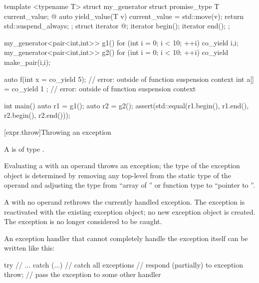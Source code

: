 \begin{example}
\begin{codeblock}
template <typename T>
struct my_generator {
  struct promise_type {
    T current_value;
    @\commentellip@
    auto yield_value(T v) {
      current_value = std::move(v);
      return std::suspend_always{};
    }
  };
  struct iterator { @\commentellip@ };
  iterator begin();
  iterator end();
};

my_generator<pair<int,int>> g1() {
  for (int i = 0; i < 10; ++i) co_yield {i,i};
}
my_generator<pair<int,int>> g2() {
  for (int i = 0; i < 10; ++i) co_yield make_pair(i,i);
}

auto f(int x = co_yield 5);     // error:  outside of function suspension context
int a[] = { co_yield 1 };       // error:  outside of function suspension context

int main() {
  auto r1 = g1();
  auto r2 = g2();
  assert(std::equal(r1.begin(), r1.end(), r2.begin(), r2.end()));
}
\end{codeblock}
\end{example}

[expr.throw]{Throwing an exception}%
%
%
%
%
\begin{bnf}
\br
      
\end{bnf}

\pnum
A  is of type .

\pnum
Evaluating a  with an operand throws an
exception; the type of the exception object is determined by removing
any top-level  from the static type of the
operand and adjusting the type
from ``array of '' or function type 
to ``pointer to ''.

\pnum
{}%
A
with no operand rethrows the currently handled exception.
The exception is reactivated with the existing exception object;
no new exception object is created.
The exception is no longer considered to be caught.
\begin{example}
An exception handler that cannot completely handle the exception itself
can be written like this:
\begin{codeblock}
try {
  // ...
} catch (...) {     // catch all exceptions
  // respond (partially) to exception
  throw;            // pass the exception to some other handler
}
\end{codeblock}
\end{example}

